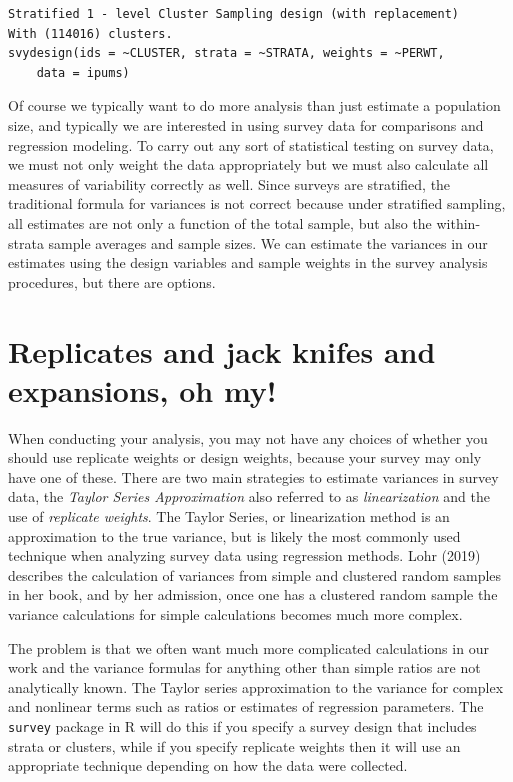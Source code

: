 \documentclass[
  letterpaper,
  DIV=11,
  numbers=noendperiod]{scrreprt}
\begin{document}
\begin{verbatim}
Stratified 1 - level Cluster Sampling design (with replacement)
With (114016) clusters.
svydesign(ids = ~CLUSTER, strata = ~STRATA, weights = ~PERWT, 
    data = ipums)
\end{verbatim}

Of course we typically want to do more analysis than just estimate a
population size, and typically we are interested in using survey data
for comparisons and regression modeling. To carry out any sort of
statistical testing on survey data, we must not only weight the data
appropriately but we must also calculate all measures of variability
correctly as well. Since surveys are stratified, the traditional formula
for variances is not correct because under stratified sampling, all
estimates are not only a function of the total sample, but also the
within-strata sample averages and sample sizes. We can estimate the
variances in our estimates using the design variables and sample weights
in the survey analysis procedures, but there are options.

\hypertarget{replicates-and-jack-knifes-and-expansions-oh-my}{%
\section{Replicates and jack knifes and expansions, oh
my!}\label{replicates-and-jack-knifes-and-expansions-oh-my}}

When conducting your analysis, you may not have any choices of whether
you should use replicate weights or design weights, because your survey
may only have one of these. There are two main strategies to estimate
variances in survey data, the \emph{Taylor Series Approximation} also
referred to as \emph{linearization} and the use of \emph{replicate
weights}. The Taylor Series, or linearization method is an approximation
to the true variance, but is likely the most commonly used technique
when analyzing survey data using regression methods. Lohr (2019)
describes the calculation of variances from simple and clustered random
samples in her book, and by her admission, once one has a clustered
random sample the variance calculations for simple calculations becomes
much more complex.

The problem is that we often want much more complicated calculations in
our work and the variance formulas for anything other than simple ratios
are not analytically known. The Taylor series approximation to the
variance for complex and nonlinear terms such as ratios or estimates of
regression parameters. The \texttt{survey} package in R will do this if
you specify a survey design that includes strata or clusters, while if
you specify replicate weights then it will use an appropriate technique
depending on how the data were collected.
\end{document}
